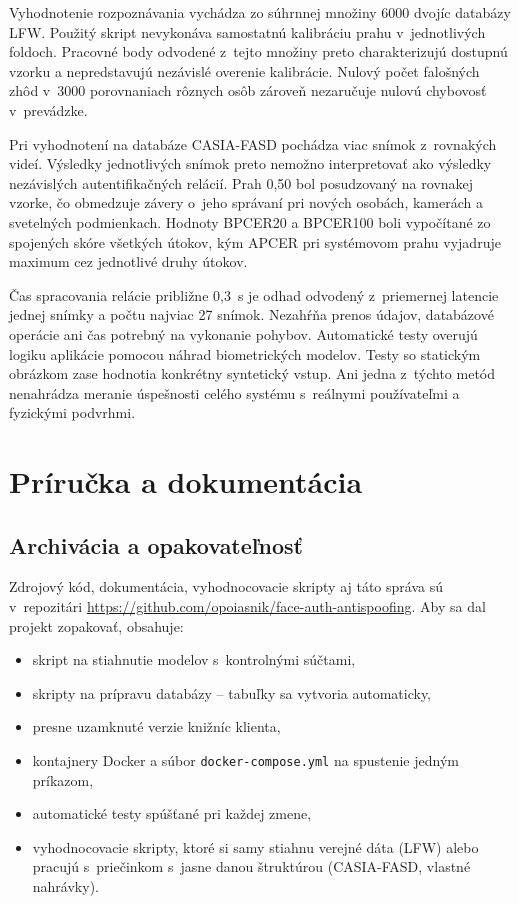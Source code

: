 \documentclass[12pt,a4paper,oneside]{report}
\begin{document}
Vyhodnotenie rozpoznávania vychádza zo súhrnnej množiny 6000 dvojíc databázy
LFW. Použitý skript nevykonáva samostatnú kalibráciu prahu v~jednotlivých
foldoch. Pracovné body odvodené z~tejto množiny preto charakterizujú dostupnú
vzorku a nepredstavujú nezávislé overenie kalibrácie. Nulový počet falošných
zhôd v~3000 porovnaniach rôznych osôb zároveň nezaručuje nulovú chybovosť
v~prevádzke.

Pri vyhodnotení na databáze CASIA-FASD pochádza viac snímok z~rovnakých videí.
Výsledky jednotlivých snímok preto nemožno interpretovať ako výsledky
nezávislých autentifikačných relácií. Prah 0,50 bol posudzovaný na rovnakej
vzorke, čo obmedzuje závery o~jeho správaní pri nových osobách, kamerách
a svetelných podmienkach. Hodnoty BPCER20 a BPCER100 boli vypočítané zo
spojených skóre všetkých útokov, kým APCER pri systémovom prahu vyjadruje
maximum cez jednotlivé druhy útokov.

Čas spracovania relácie približne 0,3~s je odhad odvodený z~priemernej
latencie jednej snímky a počtu najviac 27 snímok. Nezahŕňa prenos údajov,
databázové operácie ani čas potrebný na vykonanie pohybov. Automatické testy
overujú logiku aplikácie pomocou náhrad biometrických modelov. Testy so
statickým obrázkom zase hodnotia konkrétny syntetický vstup. Ani jedna
z~týchto metód nenahrádza meranie úspešnosti celého systému s~reálnymi
používateľmi a fyzickými podvrhmi.

\chapter{Príručka a dokumentácia}
\label{ch:prirucka}

\section{Archivácia a opakovateľnosť}

Zdrojový kód, dokumentácia, vyhodnocovacie skripty aj táto správa sú v~repozitári
\url{https://github.com/opoiasnik/face-auth-antispoofing}. Aby sa dal projekt zopakovať,
obsahuje:
\begin{itemize}
  \item skript na stiahnutie modelov s~kontrolnými súčtami,
  \item skripty na prípravu databázy -- tabuľky sa vytvoria automaticky,
  \item presne uzamknuté verzie knižníc klienta,
  \item kontajnery Docker a súbor \texttt{docker-compose.yml} na spustenie jedným príkazom,
  \item automatické testy spúšťané pri každej zmene,
  \item vyhodnocovacie skripty, ktoré si samy stiahnu verejné dáta (LFW) alebo pracujú
        s~priečinkom s~jasne danou štruktúrou (CASIA-FASD, vlastné nahrávky).
\end{itemize}
\end{document}
